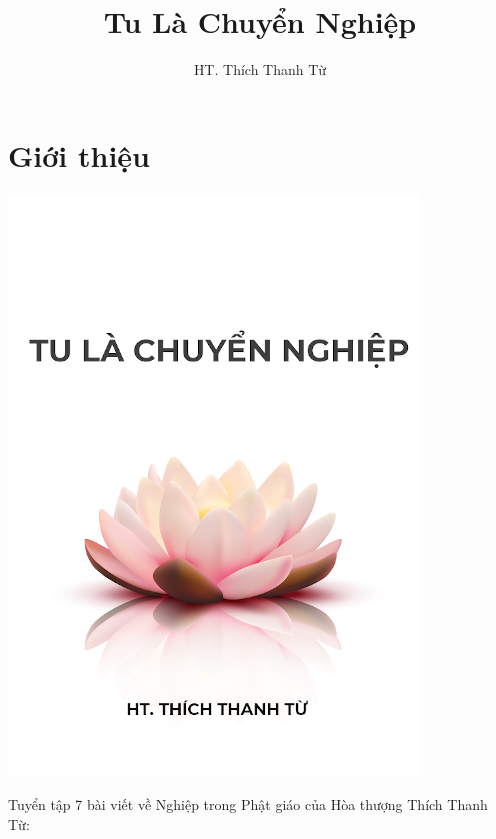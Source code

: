 \documentclass[
  12pt,
  oneside]{book}
\title{Tu Là Chuyển Nghiệp}
\author{HT. Thích Thanh Từ}
\date{}
\begin{document}
\maketitle

{
\setcounter{tocdepth}{1}
\tableofcontents
}
\hypertarget{giux1edbi-thiux1ec7u}{%
\chapter*{Giới thiệu}\label{giux1edbi-thiux1ec7u}}

\includegraphics[width=4.29167in,height=\textheight]{images/cover_resized.png}

Tuyển tập 7 bài viết về Nghiệp trong Phật giáo của Hòa thượng Thích Thanh Từ:
\end{document}
